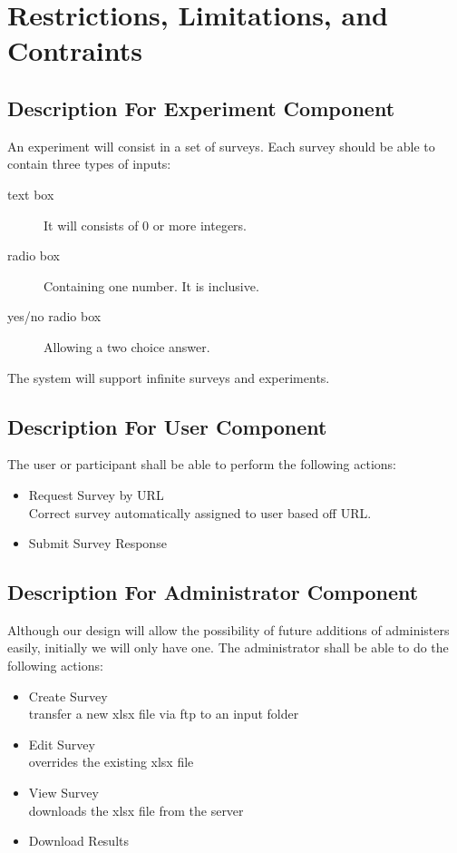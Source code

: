 \documentclass[a4paper,12pt,oneside]{report}
\begin{document}
\chapter{ Restrictions, Limitations, and Contraints}

\section{ Description For Experiment Component}
An experiment will consist in a set of surveys. Each survey should be able to contain three types of inputs:
\begin{description}
\item [text box] It will consists of 0 or more integers.
\item [radio box] Containing one number. It is inclusive.
\item  [yes/no radio box] Allowing a two choice answer.
\end{description}
The system will support infinite surveys and experiments.

\section{ Description For User Component}

The user or participant shall be able to perform the following actions:
\begin{itemize}
	\item Request Survey by URL \\ Correct survey automatically assigned to user based off URL.
	\item Submit Survey Response
\end{itemize}
\section{  Description For Administrator Component}

Although our design will allow the possibility of future additions of administers easily, initially we will only have one. The administrator shall be able to do the following actions:
\begin{itemize}
	\item Create Survey \\ transfer a new xlsx file via ftp to an input folder
	\item Edit Survey \\ overrides the existing xlsx file
	\item View Survey \\ downloads the xlsx file from the server
	\item Download Results 
\end{itemize}
\end{document}
